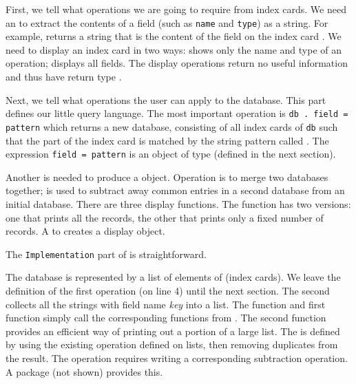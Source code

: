 {{{{{{{First, we tell \Language{} what operations we are going to require
from index cards.
We need an  to extract the contents of a field
(such as {\tt name} and {\tt type}) as a string.
For example,
 returns a string that is the content of the
 field on the index card .
We need to display an index card in two ways:
 shows only the name and type of an
operation;
 displays all fields.
The display operations return no useful information and thus have
return type .

Next, we tell \Language{} what operations the user can apply
to the database.
This part defines our little query language.
The most important operation is
{\frenchspacing\tt db . field = pattern} which
returns a new database, consisting of all index
cards of {\tt db} such that the  part of the index
card is matched by the string pattern called .
The expression {\tt field = pattern} is an object of type
 (defined in the next section).

Another  is needed to produce a 
object.
Operation \spadop{+} is to merge two databases together;
\spadop{-} is used to subtract away common entries in a second
database from an initial database.
There are three display functions.
The  function has two versions: one
that prints all the records, the other that prints only a fixed
number of records.
A  to  creates a display
object.

The {\tt Implementation} part of  is straightforward.

The database is represented by a list of elements of  (index cards).
We leave the definition of the first  operation
(on line 4) until the next section.
The second  collects all the strings with field name
{\it key} into a list.
The  function and first  function
simply call the corresponding functions from .
The second  function provides an efficient way of
printing out a portion of a large list.
The \spadop{+} is defined by using the existing
 operation defined on lists, then
removing duplicates from the result.
The \spadop{-} operation requires writing a corresponding
subtraction operation.
A package  (not shown) provides this.

}}}}}}}

